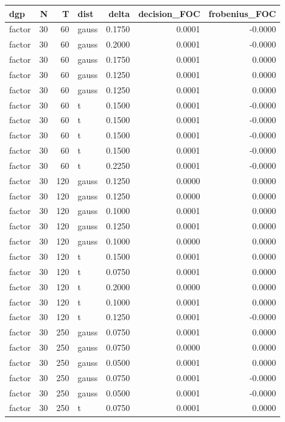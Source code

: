 \begin{tabular}{lrrlrrr}
\toprule
dgp & N & T & dist & delta & decision_FOC & frobenius_FOC \\
\midrule
factor & 30 & 60 & gauss & 0.1750 & 0.0001 & -0.0000 \\
factor & 30 & 60 & gauss & 0.2000 & 0.0001 & -0.0000 \\
factor & 30 & 60 & gauss & 0.1750 & 0.0001 & 0.0000 \\
factor & 30 & 60 & gauss & 0.1250 & 0.0001 & 0.0000 \\
factor & 30 & 60 & gauss & 0.1250 & 0.0001 & 0.0000 \\
factor & 30 & 60 & t & 0.1500 & 0.0001 & -0.0000 \\
factor & 30 & 60 & t & 0.1500 & 0.0001 & -0.0000 \\
factor & 30 & 60 & t & 0.1500 & 0.0001 & -0.0000 \\
factor & 30 & 60 & t & 0.1500 & 0.0001 & -0.0000 \\
factor & 30 & 60 & t & 0.2250 & 0.0001 & -0.0000 \\
factor & 30 & 120 & gauss & 0.1250 & 0.0000 & 0.0000 \\
factor & 30 & 120 & gauss & 0.1250 & 0.0000 & 0.0000 \\
factor & 30 & 120 & gauss & 0.1000 & 0.0001 & 0.0000 \\
factor & 30 & 120 & gauss & 0.1250 & 0.0001 & 0.0000 \\
factor & 30 & 120 & gauss & 0.1000 & 0.0000 & 0.0000 \\
factor & 30 & 120 & t & 0.1500 & 0.0001 & 0.0000 \\
factor & 30 & 120 & t & 0.0750 & 0.0001 & 0.0000 \\
factor & 30 & 120 & t & 0.2000 & 0.0000 & 0.0000 \\
factor & 30 & 120 & t & 0.1000 & 0.0001 & 0.0000 \\
factor & 30 & 120 & t & 0.1250 & 0.0001 & -0.0000 \\
factor & 30 & 250 & gauss & 0.0750 & 0.0001 & 0.0000 \\
factor & 30 & 250 & gauss & 0.0750 & 0.0000 & 0.0000 \\
factor & 30 & 250 & gauss & 0.0500 & 0.0001 & 0.0000 \\
factor & 30 & 250 & gauss & 0.0750 & 0.0001 & -0.0000 \\
factor & 30 & 250 & gauss & 0.0500 & 0.0001 & -0.0000 \\
factor & 30 & 250 & t & 0.0750 & 0.0001 & 0.0000 \\

\end{tabular}

